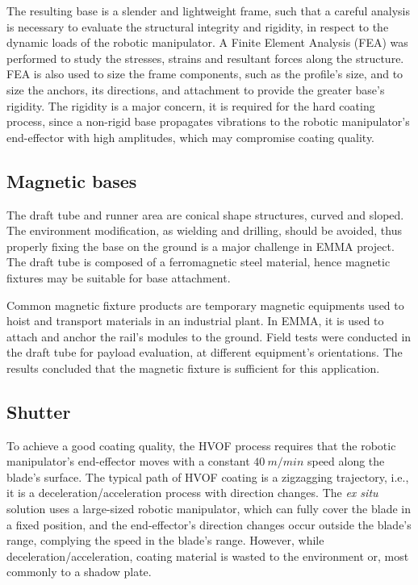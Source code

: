 The resulting base is a slender and lightweight frame, such that a careful
analysis is necessary to evaluate the structural integrity and rigidity, in
respect to the dynamic loads of the robotic manipulator. A Finite Element
Analysis (FEA) was performed to study the stresses, strains and resultant forces
along the structure. FEA is also used to size the frame components, such as
the profile's size, and to size the anchors, its directions, and attachment to
provide the greater base's rigidity. The rigidity is a major concern, it is
required for the hard coating process, since a non-rigid base propagates
vibrations to the robotic manipulator's end-effector with high amplitudes, which
may compromise coating quality.


\subsection{Magnetic bases}

The draft tube and runner area are conical shape structures, curved and
sloped. The environment modification, as wielding and drilling, should be
avoided, thus properly fixing the base on the ground is a major challenge in
EMMA project. The draft tube is composed of a ferromagnetic steel material,
hence magnetic fixtures may be suitable for base attachment. 

Common magnetic fixture products are temporary magnetic equipments used to hoist
and transport materials in an industrial plant. In EMMA, it is used to attach
and anchor the rail's modules to the ground. Field tests were conducted in the
draft tube for payload evaluation, at different equipment's orientations. The
results concluded that the magnetic fixture is sufficient for this application.


\subsection{Shutter}

To achieve a good coating quality, the HVOF process requires that the robotic
manipulator's end-effector moves with a constant $40~m/min$ speed along the
blade's surface. The typical path of HVOF coating is a zigzagging trajectory,
i.e., it is a deceleration/acceleration process with direction changes. The
\textit{ex situ} solution uses a large-sized robotic manipulator, which can
fully cover the blade in a fixed position, and the end-effector's direction
changes occur outside the blade's range, complying the speed in the blade's
range. However, while deceleration/acceleration, coating material is wasted to
the environment or, most commonly to a shadow plate.

